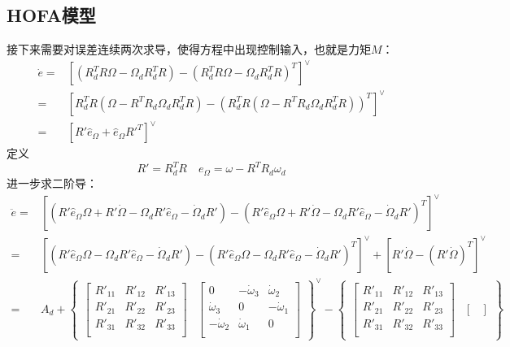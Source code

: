 \subsection*{HOFA模型}
接下来需要对误差连续两次求导，使得方程中出现控制输入，也就是力矩$M$：
$$\begin{aligned}
    \dot e=&[(R_d^TR \Omega-\Omega_dR_d^TR)-(R_d^TR \Omega-\Omega_dR_d^TR)^T]^\vee\\
    =&[R_d^TR(\Omega-R^TR_d \Omega_dR_d^TR)-(R_d^TR(\Omega-R^TR_d \Omega_dR_d^TR))^T]^\vee \\
    =&[R' \hat e_\Omega  + \hat e_\Omega R'^T]^\vee
\end{aligned} $$
    定义
    $$R'=R_d^TR \quad e_\Omega=\omega -R^TR_d \omega_d$$
进一步求二阶导：
    $$\begin{aligned}
        \ddot e =& [(R' \hat e_\Omega \Omega + R'\dot \Omega -\Omega_d R' \hat e_\Omega -\dot \Omega_d R')-(R' \hat e_\Omega \Omega + R'\dot \Omega -\Omega_d R' \hat e_\Omega -\dot \Omega_d R')^T]^\vee\\
        =&[(R' \hat e_\Omega \Omega  -\Omega_d R' \hat e_\Omega -\dot \Omega_d R')-(R' \hat e_\Omega \Omega  -\Omega_d R' \hat e_\Omega -\dot \Omega_d R')^T]^\vee+[R'\dot \Omega-(R'\dot \Omega)^T]^\vee\\
        =&A_d+ \begin{Bmatrix}
        \begin{bmatrix}
        R'_{11} &R'_{12}  & R'_{13} \\
        R'_{21} & R'_{22} & R'_{23} \\
        R'_{31} & R'_{32} &R'_{33}  \\
        \end{bmatrix}&\begin{bmatrix}
        0 & -\dot\omega_3 &\dot\omega_2  \\
         \dot\omega_3& 0 &  -\dot\omega_1\\
         -\dot\omega_2&\dot\omega_1  & 0 \\
        \end{bmatrix}\end{Bmatrix}^\vee -\begin{Bmatrix}
        \begin{bmatrix}
        R'_{11} &R'_{12}  & R'_{13} \\
        R'_{21} & R'_{22} & R'_{23} \\
        R'_{31} & R'_{32} &R'_{33}  \\
        \end{bmatrix}&\begin{bmatrix}

\end{bmatrix}
\end{Bmatrix}
\end{aligned}$$
